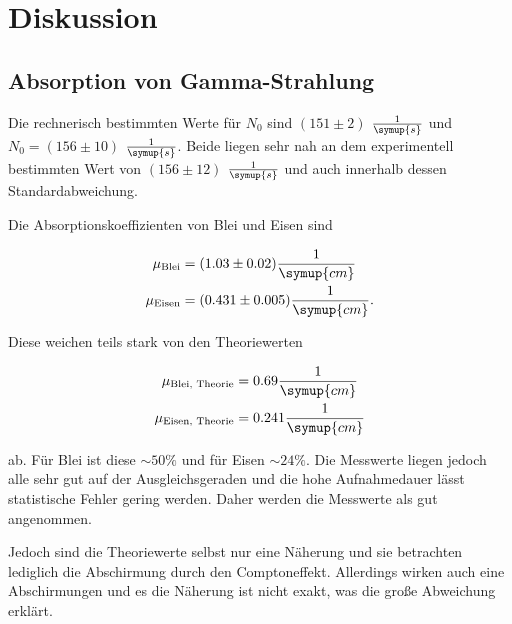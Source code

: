 \section{Diskussion}
\label{sec:Diskussion}

\subsection{Absorption von Gamma-Strahlung}

Die rechnerisch bestimmten Werte für $N_0$ sind $(151 \pm 2)$ $\frac{1}{\symup{s}}$ und $N_0 = (156 \pm 10)$ $\frac{1}{\symup{s}}$. 
Beide liegen sehr nah an dem experimentell bestimmten Wert von $(156 \pm 12)$ $\frac{1}{\symup{s}}$ und auch innerhalb dessen Standardabweichung.

Die Absorptionskoeffizienten von Blei und Eisen sind

\begin{align}
    \mu_\text{Blei} &= (1.03 \pm 0.02) \frac{1}{\symup{cm}}\\
    \mu_\text{Eisen} &= (0.431 \pm 0.005) \frac{1}{\symup{cm}}.
\end{align}

Diese weichen teils stark von den Theoriewerten

\begin{align}
    \mu_\text{Blei, Theorie} &= 0.69 \frac{1}{\symup{cm}}\\
    \mu_\text{Eisen, Theorie} &= 0.241 \frac{1}{\symup{cm}}
\end{align}

ab. Für Blei ist diese $\sim 50\%$ und für Eisen $\sim 24\%$.
Die Messwerte liegen jedoch alle sehr gut auf der Ausgleichsgeraden und die hohe Aufnahmedauer lässt statistische Fehler gering werden.
Daher werden die Messwerte als gut angenommen.

Jedoch sind die Theoriewerte selbst nur eine Näherung und sie betrachten lediglich die Abschirmung durch den Comptoneffekt.
Allerdings wirken auch eine Abschirmungen und es die Näherung ist nicht exakt, was die große Abweichung erklärt.